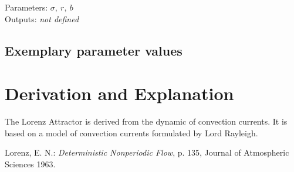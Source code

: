 \documentclass[10pt,a4paper]{article}
\begin{document}
	
	\noindent
	Parameters: $\sigma,~r,~b$ %
	\\
	Outputs: \textit{\textlangle not defined\textrangle} 
	
	
	
	\subsection{Exemplary parameter values}
	

	
	\section{Derivation and Explanation} %
	
	The Lorenz Attractor is derived from the dynamic of convection currents. It is based on a model of convection currents formulated by Lord Rayleigh. 
	
	
	\begin{thebibliography}{10}		
		Lorenz, E. N.: 
		\textit{Deterministic Nonperiodic Flow}, p. 135, Journal of Atmospheric Sciences 1963.
	\end{thebibliography}
\end{document}
